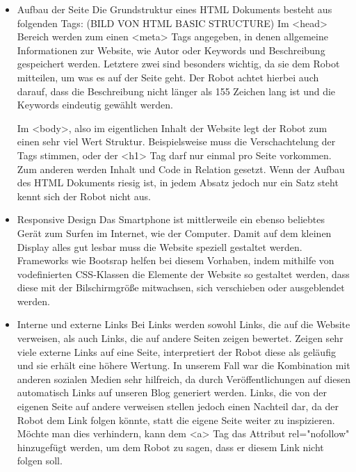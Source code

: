    \begin{itemize}
      \item Aufbau der Seite
        Die Grundstruktur eines HTML Dokuments besteht aus folgenden Tags:
        (BILD VON HTML BASIC STRUCTURE)
        Im <head> Bereich werden zum einen <meta> Tags angegeben, in denen allgemeine Informationen zur Website, wie Autor oder Keywords und Beschreibung gespeichert werden.
        Letztere zwei sind besonders wichtig, da sie dem Robot mitteilen, um was es auf der Seite geht. Der Robot achtet hierbei auch darauf, dass die Beschreibung nicht
        länger als 155 Zeichen lang ist und die Keywords eindeutig gewählt werden.

        Im <body>, also im eigentlichen Inhalt der Website legt der Robot zum einen sehr viel Wert Struktur. Beispielsweise muss die Verschachtelung der Tags stimmen, oder der <h1> Tag darf nur einmal pro Seite
        vorkommen. Zum anderen werden Inhalt und Code in Relation gesetzt. Wenn der Aufbau des HTML Dokuments riesig ist, in jedem Absatz jedoch nur ein Satz steht kennt sich der Robot nicht aus.

      \item Responsive Design
        Das Smartphone ist mittlerweile ein ebenso beliebtes Gerät zum Surfen im Internet, wie der Computer. Damit auf dem kleinen Display alles gut lesbar muss die Website speziell
        gestaltet werden. Frameworks wie Bootsrap helfen bei diesem Vorhaben, indem mithilfe von vodefinierten CSS-Klassen die Elemente der Website so gestaltet werden, dass diese mit der
        Bilschirmgröße mitwachsen, sich verschieben oder ausgeblendet werden.

      \item Interne und externe Links
        Bei Links werden sowohl Links, die auf die Website verweisen, als auch Links, die auf andere Seiten zeigen bewertet.
        Zeigen sehr viele externe Links auf eine Seite, interpretiert der Robot diese als geläufig und sie erhält eine höhere Wertung. In unserem Fall war die Kombination mit anderen sozialen
        Medien sehr hilfreich, da durch Veröffentlichungen auf diesen automatisch Links auf unseren Blog generiert werden.
        Links, die von der eigenen Seite auf andere verweisen stellen jedoch einen Nachteil dar, da der Robot dem Link folgen könnte, statt die eigene Seite weiter zu inspizieren. Möchte man dies
        verhindern, kann dem <a> Tag das Attribut rel="nofollow" hinzugefügt werden, um dem Robot zu sagen, dass er diesem Link nicht folgen soll.


\end{itemize}
